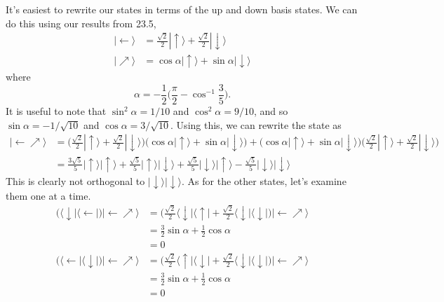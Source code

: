 \documentclass[../road-to-reality.tex]{subfiles}
\begin{document}
\begin{questions}
		\begin{solution}
			It's easiest to rewrite our states in terms of the up and down basis states. We can do this using our results from 23.5,
			\begin{align*}
				|\!\leftarrow\rangle &= \frac{\sqrt{2}}{2}|\!\uparrow\rangle + \frac{\sqrt{2}}{2}|\!\downarrow\rangle \\
				|\!\nearrow\rangle &= \cos \alpha|\!\uparrow\rangle + \sin \alpha|\!\downarrow\rangle
			\end{align*}
			where
			\[
				\alpha = -\frac{1}{2}\Big(\frac{\pi}{2} - \cos^{-1}\frac{3}{5}\Big).
			\]
			It is useful to note that $\sin^2\alpha = 1/10$ and $\cos^2\alpha = 9/10$, and so $\sin\alpha = -1/\sqrt{10}$ and $\cos\alpha = 3/\sqrt{10}$. Using this, we can rewrite the state as
			\begin{align*}
				|\!\leftarrow\nearrow\rangle &= \Big(\frac{\sqrt{2}}{2}|\!\uparrow\rangle + \frac{\sqrt{2}}{2}|\!\downarrow\rangle\Big)\Big(\cos\alpha|\!\uparrow\rangle + \sin\alpha|\!\downarrow\rangle\Big) + \Big(\cos\alpha|\!\uparrow\rangle + \sin\alpha|\!\downarrow\rangle\Big)\Big(\frac{\sqrt{2}}{2}|\!\uparrow\rangle + \frac{\sqrt{2}}{2}|\!\downarrow\rangle\Big) \\
				&= \frac{3\sqrt{5}}{5}|\!\uparrow\rangle|\!\uparrow\rangle + \frac{\sqrt{5}}{5}|\!\uparrow\rangle|\!\downarrow\rangle + \frac{\sqrt{5}}{5}|\!\downarrow\rangle|\!\uparrow\rangle - \frac{\sqrt{5}}{5}|\!\downarrow\rangle|\!\downarrow\rangle
			\end{align*}
			This is clearly not orthogonal to $|\!\downarrow\rangle|\!\downarrow\rangle$. As for the other states, let's examine them one at a time.
			\begin{align*}
				\Big(\langle\downarrow\!|\langle\leftarrow\!|\Big)|\!\leftarrow\nearrow\rangle &= \Big(\frac{\sqrt{2}}{2}\langle\downarrow\!|\langle\uparrow\!| + \frac{\sqrt{2}}{2}\langle\downarrow|\langle\downarrow\!|\Big)|\!\leftarrow\nearrow\rangle \\
				&= \frac{3}{2}\sin\alpha + \frac{1}{2}\cos\alpha \\
				&= 0 \\
				\Big(\langle\leftarrow\!|\langle\downarrow\!|\Big)|\!\leftarrow\nearrow\rangle &= \Big(\frac{\sqrt{2}}{2}\langle\uparrow\!|\langle\downarrow\!| + \frac{\sqrt{2}}{2}\langle\downarrow|\langle\downarrow\!|\Big)|\!\leftarrow\nearrow\rangle \\
				&= \frac{3}{2}\sin\alpha + \frac{1}{2}\cos\alpha \\
				&= 0 \\

\end{align*}
\end{solution}
\end{questions}
\end{document}
